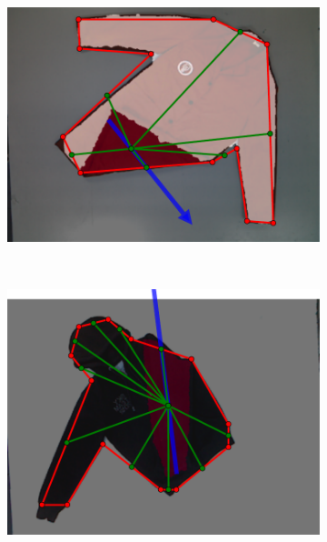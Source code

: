 \begin{figure}[htbp]
\begin{subfigure}[l]{\bigtablewidth}
    	\includegraphics[width=\textwidth]
    	{figures/results/robe8-pnp.pdf}
	\end{subfigure}
	~
    \begin{subfigure}[r]{\bigtablewidth}
	    \centering
    	\includegraphics[width=\textwidth]
    	{figures/results/hoodie9-pnp.pdf}
	\end{subfigure} 
	~
	\begin{subfigure}[l]{\bigtablewidth}
	    \centering

\end{subfigure}
\end{figure}
